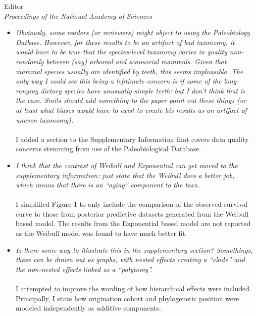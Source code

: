 \documentclass{letter}
\begin{document}
\begin{letter}{Editor \\ \textit{Proceedings of the National Academy of Sciences}}
\begin{itemize}
      \\\\In order to attempt to improve the interpretability of the use of categorical covariates in a regression model, I added two aspects to the manuscript. First, I expanded the textual explanation of how the effects of categorical covariates are interpreted. Second, I increase the amount of explanation present in the caption of Figure 2. Additionally, I altered Figure 2 to hopefully better illustrate the comparisons being made. 
    \item \textit{Obviously, some readers (or reviewers) might object to using the Paleobiology Datbase. However, for these results to be an artifact of bad taxonomy, it would have to be true that the species-level taxonomy varies in quality non-randomly between (say) arboreal and scansorial mammals. Given that mammal species usually are identified by teeth, this seems impluasible. The only way I could see this being a lefitimate concern is if some of the long-ranging dietary species have unusually simple teeth: but I don't think that is the case. Smits should add something to the paper point out these things (or at least what biases would have to exist to create his results as an artifact of uneven taxonomy).}
      \\\\I added a section to the Supplementary Information that covers data quality concerns stemming from use of the Paleobiological Database. 
    \item \textit{I think that the contrast of Weibull and Exponential can get moved to the supplementary information: just state that the Weibull does a better job, which means that there is an ``aging'' component to the taxa.}
      \\\\I simplified Figure 1 to only include the comparison of the observed survival curve to those from posterior predictive datasets generated from the Weibull based model. The results from the Exponential based model are not reported as the Weibull model was found to have much better fit.
    \item \textit{Is there some way to illustrate this in the supplementary section? Somethings, these can be drawn out as graphs, with nested effects creating a ``clade'' and the non-nested effects linked as a ``polytomy''.}
      \\\\I attempted to improve the wording of how hierarchical effects were included. Principally, I state how origination cohort and phylogenetic position were modeled independently as additive components. 

\end{itemize}
\end{letter}
\end{document}
